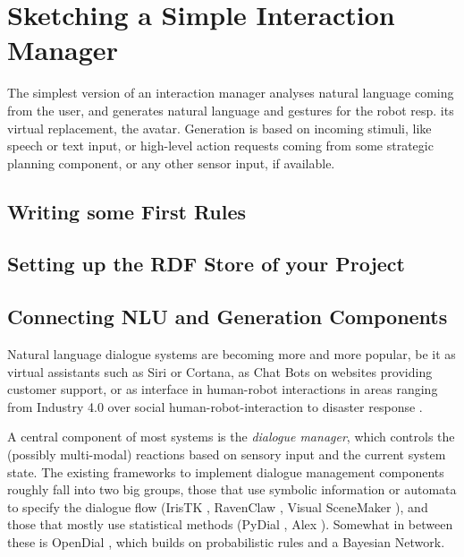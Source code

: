 \documentclass[a4paper]{report}
\begin{document}
\chapter{Sketching a Simple Interaction Manager}

The simplest version of an interaction manager analyses natural language
coming from the user, and generates natural language and gestures for the robot
resp. its virtual replacement, the avatar. Generation is based on incoming
stimuli, like speech or text input, or high-level action requests coming from
some strategic planning component, or any other sensor input, if available.

\section{Writing some First Rules}

\section{Setting up the RDF Store of your Project} \label{sec:hfc}

\section{Connecting NLU and Generation Components}












%
Natural language dialogue systems are becoming more and more popular, be it as
virtual assistants such as Siri or Cortana, as Chat Bots on websites providing
customer support, or as interface in human-robot interactions in areas ranging
from Industry 4.0 \citep{schwartz2016hybrid} over social human-robot-interaction
\citep{alize2010} to disaster response \citep{kruijff2015tradr}.

A central component of most systems is the \emph{dialogue manager}, which
controls the (possibly multi-modal) reactions based on sensory input and the
current system state. The existing frameworks to implement dialogue management
components roughly fall into two big groups, those that use symbolic
information or automata to specify the dialogue flow (IrisTK
\citep{2012iristk}, RavenClaw \citep{bohus2009ravenclaw}, Visual SceneMaker
\citep{gebhard2012visual}), and those that mostly use statistical methods
(PyDial \cite{ultes2017pydial}, Alex \citep{jurvcivcek2014alex}). Somewhat in
between these is OpenDial \citep{lison2015developing}, which builds on
probabilistic rules and a Bayesian Network.
\end{document}
